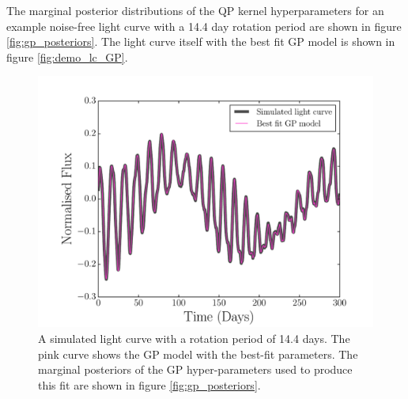 The marginal posterior distributions of the QP kernel hyperparameters for an
example noise-free light curve  with a 14.4 day rotation period are shown in
figure \ref{fig:gp_posteriors}.
The light curve itself with the best fit GP model is shown in figure
\ref{fig:demo_lc_GP}.

\begin{figure}
\begin{center}
\includegraphics[width=6in, clip=true]{figures/demo_lc_GP.pdf}
\caption{A simulated light curve with a rotation period of 14.4 days.
The pink curve shows the GP model with the best-fit parameters.
The marginal posteriors of the GP hyper-parameters used to produce this fit
are shown in figure \ref{fig:gp_posteriors}.}
\end{center}
\end{figure}
\label{fig:demo_lc_GP}

